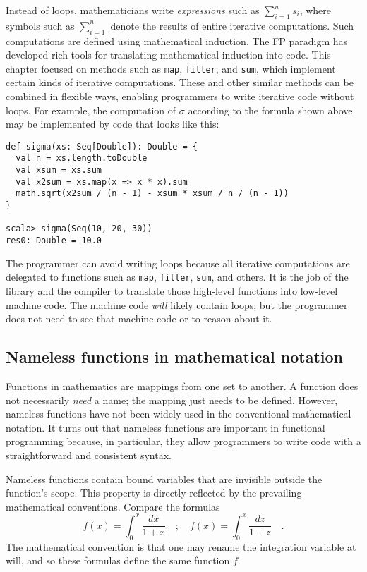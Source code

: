 Instead of loops, mathematicians write \emph{expressions} such as
$\sum_{i=1}^{n}s_{i}$, where symbols such as $\sum_{i=1}^{n}$ denote
the results of entire iterative computations. Such computations are
defined using mathematical induction.
The FP paradigm has developed rich tools for translating mathematical
induction into code. This chapter focused on methods such as \lstinline!map!,
\lstinline!filter!, and \lstinline!sum!, which implement certain
kinds of iterative computations. These and other similar methods can
be combined in flexible ways, enabling programmers to write iterative
code without loops. For example, the computation of $\sigma$ according
to the formula shown above may be implemented by code that looks like
this:
\begin{lstlisting}
def sigma(xs: Seq[Double]): Double = {
  val n = xs.length.toDouble
  val xsum = xs.sum
  val x2sum = xs.map(x => x * x).sum
  math.sqrt(x2sum / (n - 1) - xsum * xsum / n / (n - 1))
}

scala> sigma(Seq(10, 20, 30))
res0: Double = 10.0
\end{lstlisting}

The programmer can avoid writing loops because all iterative computations
are delegated to functions such as \lstinline!map!, \lstinline!filter!,
\lstinline!sum!, and others. It is the job of the library and the
compiler to translate those high-level functions into low-level machine
code. The machine code \emph{will} likely contain loops; but the programmer
does not need to see that machine code or to reason about it.

\subsection{Nameless functions in mathematical notation\label{subsec:Nameless-functions-in-mathematical-notation}}

Functions in mathematics are mappings from one set to another. A function
does not necessarily \emph{need} a name; the mapping just needs to
be defined. However, nameless functions have not been widely used
in the conventional mathematical notation. It turns out that nameless
functions are important in functional programming because, in particular,
they allow programmers to write code with a straightforward and consistent
syntax.

Nameless functions contain bound variables that are invisible outside
the function\textsf{'}s scope. This property is directly reflected by the prevailing
mathematical conventions. Compare the formulas
\[
f\left(x\right)=\int_{0}^{x}\frac{dx}{1+x}\quad;\quad f\left(x\right)=\int_{0}^{x}\frac{dz}{1+z}\quad.
\]
The mathematical convention is that one may rename the integration
variable at will, and so these formulas define the same function $f$.

